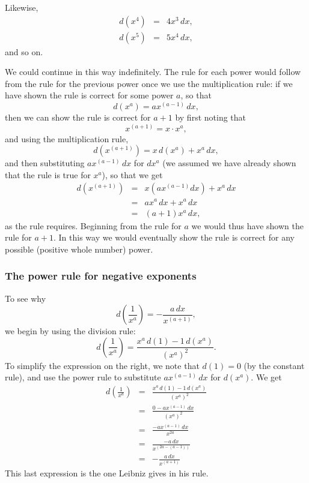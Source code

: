 \documentclass[twoside,openright]{article}
\newlength{\oldjot}
\begin{document}
Likewise, 
\begin{eqnarray*}
d(x^4) & = & 4x^3\,dx,\\
d(x^5) & = & 5x^4\,dx,
\end{eqnarray*}
and so on.

We could continue in this way indefinitely.  The rule for each power
would follow from the rule for the previous power once we use the
multiplication rule: if we have shown the rule is correct for some
power $a$, so that
$$d(x^a) = ax^{(a-1)}\,dx,$$
then we can show the rule is correct for $a+1$ by first noting that 
$$x^{(a+1)} = x \cdot x^a,$$ 
and using the multiplication rule,
$$d(x^{(a+1)}) = x\,d(x^a) + x^a\,dx,$$
and then substituting $ax^{(a-1)}\,dx$ for $dx^a$ (we assumed we have
already shown that the rule is true for $x^a$), so that we get
\begin{eqnarray*}
d(x^{(a+1)}) & = & x(ax^{(a-1)}dx) + x^a\,dx \\
& = & ax^a\,dx + x^a\,dx \\
& = & (a+1)x^a\,dx,
\end{eqnarray*}
as the rule requires.  Beginning from the rule for $a$ we would thus
have shown the rule for $a+1$.  In this way we would eventually show
the rule is correct for any possible (positive whole number) power.

\subsubsection*{The power rule for negative exponents}

To see why 
$$d\left(\frac{1}{x^a}\right) = - \frac{a\,dx}{x^{(a+1)}},$$
we begin by using the division rule:
$$d\left(\frac{1}{x^a}\right) = \frac{x^a\,d(1) - 1\,d(x^a)}{(x^a)^2}.$$
To simplify the expression on the right, we note that $d(1) = 0$ (by
the constant rule), and use the power rule to substitute
$ax^{(a-1)}\,dx$ for $d(x^a)$.  We get \setlength{\jot}{1.5ex}
\begin{eqnarray*}
d\left(\frac{1}{x^a}\right) & = & \frac{x^a\,d(1) - 1\,d(x^a)}{(x^a)^2}\\
& = & \frac{0 -ax^{(a-1)}\,dx}{(x^a)^2} \\
& = & \frac{-ax^{(a-1)}\,dx}{x^{2a}}\\
& = & \frac{-a\,dx}{x^{(2a-(a-1))}}\\
& = & -\frac{a\,dx}{x^{(a+1)}}
\end{eqnarray*}
\setlength{\jot}{\oldjot}
This last expression is the one Leibniz gives in his rule.
\end{document}
